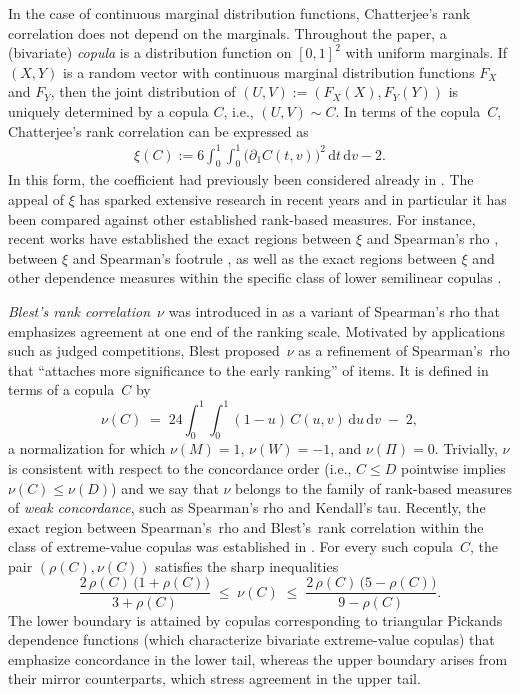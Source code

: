 \documentclass{article}
\newcommand{\1}{\mathds{1}}
\newcommand{\de}{\mathrm{\,d}}
\begin{document}
In the case of continuous marginal distribution functions, Chatterjee's rank correlation does not depend on the marginals.
Throughout the paper, a (bivariate) \emph{copula} is a distribution function on $[0,1]^2$ with uniform marginals.
If $(X,Y)$ is a random vector with continuous marginal distribution functions $F_X$ and $F_Y$, then the joint distribution of $(U,V):=(F_X(X),F_Y(Y))$ is uniquely determined by a copula $C$, i.e., $(U,V)\sim C$.
In terms of the copula~$C$, Chatterjee's rank correlation can be expressed as
\begin{align}\label{eq:xi}
  \xi(C)
  :=
  6 \int_0^1\!\!\int_0^1 \bigl(\partial_1 C(t,v)\bigr)^2 \de t \de v
  - 2 .
\end{align}
In this form, the coefficient had previously been considered already in \cite{dette2013copula}.
The appeal of $\xi$ has sparked extensive research in recent years and in particular it has been compared against other established rank-based measures.
For instance, recent works have established the exact regions between $\xi$ and Spearman's rho \cite{ansari2025exact}, between $\xi$ and Spearman's footrule \cite{rockel2025exact}, as well as the exact regions between $\xi$ and other dependence measures within the specific class of lower semilinear copulas \cite{fuchs2025exact}.

\emph{Blest's rank correlation}~$\nu$ was introduced in \cite{blest2000rank} as a variant of Spearman's rho that emphasizes agreement at one end of the ranking scale.
Motivated by applications such as judged competitions, Blest proposed~$\nu$ as a refinement of Spearman's~rho that ``attaches more significance to the early ranking'' of items.
It is defined in terms of a copula~$C$ by
\begin{equation}\label{eq:nu}
  \nu(C)
  \;=\;
  24 \int_0^1 \!\!\int_0^1 (1-u)\,C(u,v)\de u\de v \;-\;2,
\end{equation}
a normalization for which $\nu(M)=1$, $\nu(W)=-1$, and $\nu(\Pi)=0$.
Trivially, $\nu$ is consistent with respect to the concordance order (i.e., $C\le D$ pointwise implies $\nu(C)\le \nu(D)$) and we say that $\nu$ belongs to the family of rank-based measures of \emph{weak concordance}, such as Spearman's rho and Kendall's tau.
Recently, the exact region between Spearman's~rho and Blest's~rank correlation within the class of extreme-value copulas was established in \cite{tschimpke2025exact}.
For every such copula~$C$, the pair $(\rho(C),\nu(C))$ satisfies the sharp inequalities
\[
  \frac{2\,\rho(C)\,\bigl(1+\rho(C)\bigr)}{3+\rho(C)}
  \;\le\;
  \nu(C)
  \;\le\;
  \frac{2\,\rho(C)\,\bigl(5-\rho(C)\bigr)}{9-\rho(C)}.
\]
The lower boundary is attained by copulas corresponding to triangular Pickands dependence functions (which characterize bivariate extreme-value copulas) that emphasize concordance in the lower tail, whereas the upper boundary arises from their mirror counterparts, which stress agreement in the upper tail.
\end{document}
